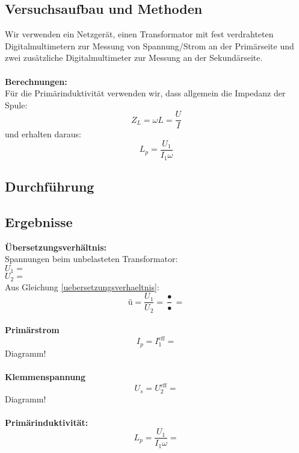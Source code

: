 \documentclass{article}
\begin{document}
\subsection{Versuchsaufbau und Methoden}
Wir verwenden ein Netzgerät, einen Transformator mit fest verdrahteten Digitalmultimetern zur Messung von Spannung/Strom an der Primärseite und zwei zusätzliche Digitalmultimeter zur Messung an der Sekundärseite.\\
\\
\textbf{Berechnungen:}\\
Für die Primärinduktivität verwenden wir, dass allgemein die Impedanz der Spule:
$$Z_L=\omega L = \frac{U}{I}$$
und erhalten daraus:
\begin{equation}
\label{Induktivitaet}
L_p=\frac{U_1}{I_1 \omega}
\end{equation}


\subsection{Durchführung}


\subsection{Ergebnisse}
\textbf{Übersetzungsverhältnis:}\\
Spannungen beim unbelasteten Transformator:\\
$U_1=$\\
$U_2=$\\
Aus Gleichung \ref{uebersetzungsverhaeltnis}:\\
$$\textrm{ü}=\frac{U_1}{U_2}=\frac{•}{•}=$$
\\
\textbf{Primärstrom}\\
$$I_p=I_1^{\textrm{eff}}=$$
Diagramm!\\
\\
\textbf{Klemmenspannung}\\
$$U_s=U_2^{\textrm{eff}}=$$
Diagramm!\\
\\
\textbf{Primärinduktivität:}\\
$$L_p=\frac{U_1}{I_1 \omega}=$$
\end{document}
